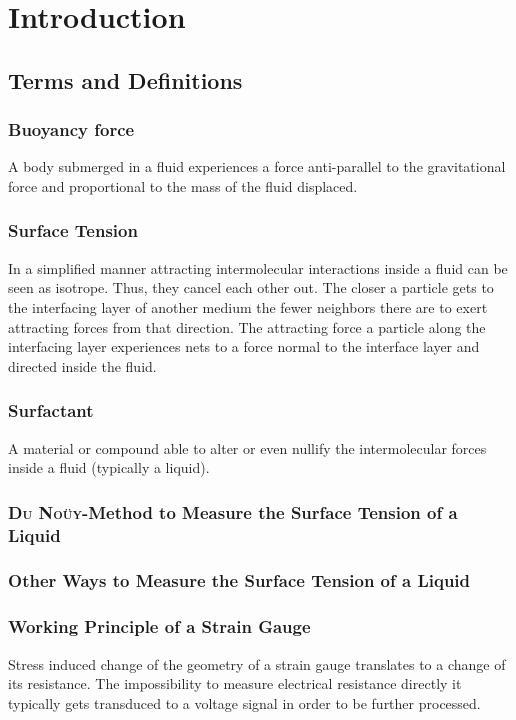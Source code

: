 \chapter{Introduction}
    \section{Terms and Definitions}
        \subsection*{Buoyancy force}\label{sec:Buoyancy force}
        A body submerged in a fluid experiences a force anti-parallel to the gravitational force and proportional to the
        mass of the fluid displaced.
        \subsection*{Surface Tension}
        In a simplified manner attracting intermolecular interactions inside a fluid can be seen as isotrope. Thus,
        they cancel each other out. The closer a particle gets to the interfacing layer of another medium the fewer neighbors
        there are to exert attracting forces from that direction. The attracting force a particle along the interfacing
        layer experiences nets to a force normal to the interface layer and directed inside the fluid.
        \subsection*{Surfactant}
        A material or compound able to alter or even nullify the intermolecular forces inside a fluid (typically a liquid).
        \subsection*{\textsc{Du Noüy}-Method to Measure the Surface Tension of a Liquid}
        \subsection*{Other Ways to Measure the Surface Tension of a Liquid}
        \subsection*{Working Principle of a Strain Gauge}
        Stress induced change of the geometry of a strain gauge translates to a change of its resistance. The impossibility
        to measure electrical resistance directly it typically gets transduced to a voltage signal in order to be further
        processed.
